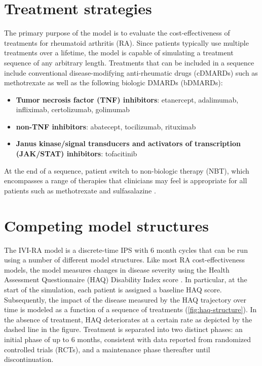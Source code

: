 \documentclass[11pt,final,fleqn]{article}\usepackage[]{graphicx}\usepackage[]{color}
\theoremstyle{plain}
\begin{document}
\section{Treatment strategies}\label{sec:treatments}
The primary purpose of the model is to evaluate the cost-effectiveness of treatments for rheumatoid arthritis (RA). Since patients typically use multiple treatments over a lifetime, the model is capable of simulating a treatment sequence of any arbitrary length. Treatments that can be included in a sequence include conventional disease-modifying anti-rheumatic drugs (cDMARDs) such as methotrexate as well as the following biologic DMARDs (bDMARDs):

\begin{itemize}
\item \textbf{Tumor necrosis factor (TNF) inhibitors}: etanercept, adalimumab, infliximab, certolizumab, golimumab
\item \textbf{non-TNF inhibitors}: abatecept, tocilizumab, rituximab
\item \textbf{Janus kinase/signal transducers and activators of transcription (JAK/STAT) inhibitors}: tofacitinib
\end{itemize}

At the end of a sequence, patient switch to non-biologic therapy (NBT), which encompasses a range of therapies that clinicians may feel is appropriate for all patients such as methotrexate and sulfasalazine \citep{stevenson2016adalimumab, stevenson2017cost}.

\section{Competing model structures}\label{sec:model-structures}
The IVI-RA model is a discrete-time IPS with 6 month cycles that can be run using a number of different model structures. Like most RA cost-effectiveness models, the model measures changes in disease severity using the Health Assessment Questionnaire (HAQ) Disability Index score \citep{tosh2011sheffield, carlson2015economic, stephens2015modelling, stevenson2016adalimumab, icer2017tim, stevenson2017cost}. In particular, at the start of the simulation, each patient is assigned a baseline HAQ score. Subsequently, the impact of the disease measured by the HAQ trajectory over time is modeled as a function of a sequence of treatments (\autoref{fig:haq-structure}). In the absence of treatment, HAQ deteriorates at a certain rate as depicted by the dashed line in the figure. Treatment is separated into two distinct phases: an initial phase of up to 6 months, consistent with data reported from randomized controlled trials (RCTs), and a maintenance phase thereafter until discontinuation. 
\end{document}
